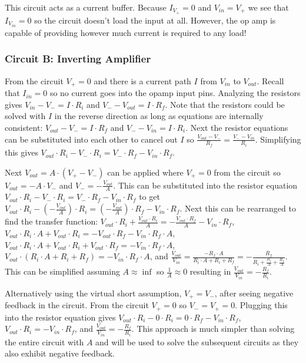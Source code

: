 \documentclass[main.tex]{subfiles}
\begin{document}
This circuit acts as a current buffer. Because $I_{V_{+}} = 0$ and $V_{in} = V_{+}$ we see that $I_{V_{in}} = 0$ so the circuit doesn't load the input at all. However, the op amp is capable of providing however much current is required to any load! 

\subsubsection{Circuit B: Inverting Amplifier}
From the circuit $V_{+} = 0$ and there is a current path $I$ from $V_{in}$ to $V_{out}$. Recall that $I_{in} = 0$ so no current goes into the opamp input pins. Analyzing the resistors gives $V_{in} - V_{-} = I \cdot R_i$ and $V_{-} - V_{out} = I \cdot R_f$. Note that the resistors could be solved with $I$ in the reverse direction as long as equations are internally consistent: $V_{out} - V_{-} = I \cdot R_f$ and $V_{-} - V_{in} = I \cdot R_i$. Next the resistor equations can be substituted into each other to cancel out $I$ so $\frac{V_{out} - V_{-}}{R_f} = \frac{V_{-} - V_{in}}{R_i}$. Simplifying this gives $V_{out} \cdot R_i - V_{-} \cdot R_i = V_{-} \cdot R_f - V_{in} \cdot R_f$. 

Next $V_{out} = A \cdot (V_{+} - V_{-})$ can be applied where $V_{+} = 0$ from the circuit so $V_{out} = -A \cdot V_{-}$ and $V_{-} = -\frac{V_{out}}{A}$. This can be substituted into the resistor equation $V_{out} \cdot R_i - V_{-} \cdot R_i = V_{-} \cdot R_f - V_{in} \cdot R_f$ to get $V_{out} \cdot R_i - (-\frac{V_{out}}{A}) \cdot R_i = (-\frac{V_{out}}{A}) \cdot R_f - V_{in} \cdot R_f$. Next this can be rearranged to find the transfer function: $V_{out} \cdot R_i + \frac{V_{out} \cdot R_i}{A} = -\frac{V_{out} \cdot R_f}{A} - V_{in} \cdot R_f$, $V_{out} \cdot R_i \cdot A + V_{out} \cdot R_i = -V_{out} \cdot R_f - V_{in} \cdot R_f \cdot A$, $V_{out} \cdot R_i \cdot A + V_{out} \cdot R_i + V_{out} \cdot R_f = - V_{in} \cdot R_f \cdot A$, $V_{out} \cdot (R_i \cdot A + R_i + R_f) = - V_{in} \cdot R_f \cdot A$, and $\frac{V_{out}}{V_{in}} = \frac{-R_f \cdot A}{R_i \cdot A + R_i + R_f} = -\frac{R_f}{R_i + \frac{R_i}{A} + \frac{R_f}{A}}$. This can be simplified assuming $A \approx \inf$ so $\frac{1}{A} \approx 0$ resulting in $\frac{V_{out}}{V_{in}} = -\frac{R_f}{R_i}$. 

Alternatively using the virtual short assumption, $V_{+} = V_{-}$, after seeing negative feedback in the circuit. From the circuit $V_{+} = 0$ so $V_{-} = V_{+} = 0$. Plugging this into the resistor equation gives $V_{out} \cdot R_i - 0 \cdot R_i = 0 \cdot R_f - V_{in} \cdot R_f$, $V_{out} \cdot R_i = - V_{in} \cdot R_f$, and $\frac{V_{out}}{V_{in}} = -\frac{R_f}{R_i}$. This approach is much simpler than solving the entire circuit with $A$ and will be used to solve the subsequent circuits as they also exhibit negative feedback.  
\end{document}
